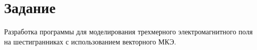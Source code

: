 \chapter*{Задание}


Разработка программы для моделирования трехмерного электромагнитного поля на шестигранниках с использованием векторного МКЭ.